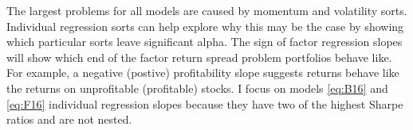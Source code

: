 The largest problems for all models are caused by momentum and volatility
sorts.
Individual regression sorts can help explore why this may be the case by
showing which particular sorts leave significant alpha.
The sign of factor regression slopes will show which end of the factor return
spread problem portfolios behave like.
For example, a negative (postive) profitability slope suggests returns behave
like the returns on unprofitable (profitable) stocks.
I focus on models \ref{eq:B16} and \ref{eq:F16} individual regression slopes
because they have two of the highest Sharpe ratios and are not nested.

